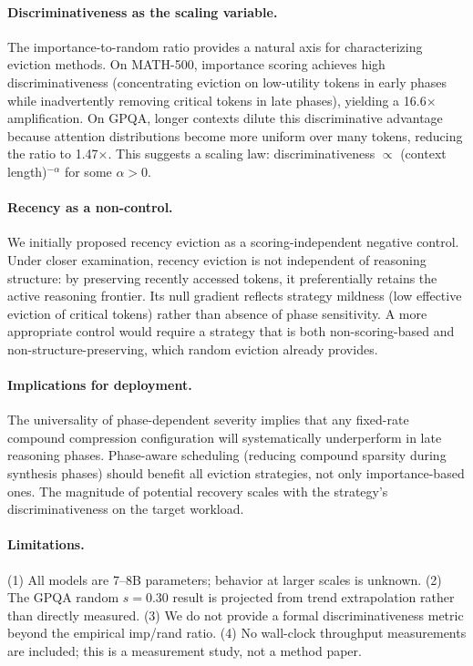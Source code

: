 \documentclass[11pt,a4paper]{article}
\begin{document}
\paragraph{Discriminativeness as the scaling variable.}
The importance-to-random ratio provides a natural axis for characterizing eviction methods. On MATH-500, importance scoring achieves high discriminativeness (concentrating eviction on low-utility tokens in early phases while inadvertently removing critical tokens in late phases), yielding a 16.6$\times$ amplification. On GPQA, longer contexts dilute this discriminative advantage because attention distributions become more uniform over many tokens, reducing the ratio to 1.47$\times$. This suggests a scaling law: discriminativeness $\propto$ (context length)$^{-\alpha}$ for some $\alpha > 0$.

\paragraph{Recency as a non-control.}
We initially proposed recency eviction as a scoring-independent negative control. Under closer examination, recency eviction is not independent of reasoning structure: by preserving recently accessed tokens, it preferentially retains the active reasoning frontier. Its null gradient reflects strategy mildness (low effective eviction of critical tokens) rather than absence of phase sensitivity. A more appropriate control would require a strategy that is both non-scoring-based and non-structure-preserving, which random eviction already provides.

\paragraph{Implications for deployment.}
The universality of phase-dependent severity implies that any fixed-rate compound compression configuration will systematically underperform in late reasoning phases. Phase-aware scheduling (reducing compound sparsity during synthesis phases) should benefit all eviction strategies, not only importance-based ones. The magnitude of potential recovery scales with the strategy's discriminativeness on the target workload.

\paragraph{Limitations.}
(1) All models are 7--8B parameters; behavior at larger scales is unknown. (2) The GPQA random $s=0.30$ result is projected from trend extrapolation rather than directly measured. (3) We do not provide a formal discriminativeness metric beyond the empirical imp/rand ratio. (4) No wall-clock throughput measurements are included; this is a measurement study, not a method paper.
\end{document}
